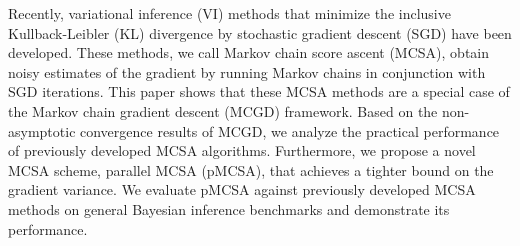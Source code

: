 
Recently, variational inference (VI) methods that minimize the inclusive Kullback-Leibler (KL) divergence by stochastic gradient descent (SGD) have been developed.
These methods, we call Markov chain score ascent (MCSA), obtain noisy estimates of the gradient by running Markov chains in conjunction with SGD iterations.
This paper shows that these MCSA methods are a special case of the Markov chain gradient descent (MCGD) framework.
Based on the non-asymptotic convergence results of MCGD, we analyze the practical performance of previously developed MCSA algorithms.
Furthermore, we propose a novel MCSA scheme, parallel MCSA (pMCSA), that achieves a tighter bound on the gradient variance.
We evaluate pMCSA against previously developed MCSA methods on general Bayesian inference benchmarks and demonstrate its performance.


